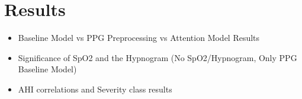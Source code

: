 \chapter{Results \label{Chapter-Results}}

\begin{itemize}
    \item Baseline Model vs PPG Preprocessing vs Attention Model Results
    \item Significance of SpO2 and the Hypnogram (No SpO2/Hypnogram, Only PPG Baseline Model)
    \item AHI correlations and Severity class results
\end{itemize}